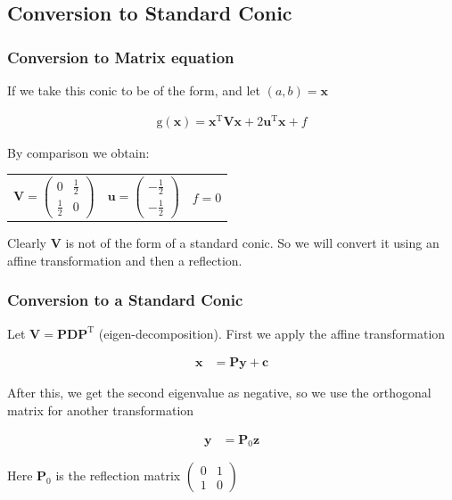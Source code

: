 \documentclass{beamer}
\theoremstyle{remark}
\newcommand{\myvec}[1]{\ensuremath{\begin{pmatrix}#1\end{pmatrix}}}
\let\vec\mathbf
\numberwithin{equation}{section}
\begin{document}
\subsection{Conversion to Standard Conic}
\begin{frame}
\frametitle{Conversion to Matrix equation}

If we take this conic to be of the form, and let $(a, b) = \vec{x}$

\begin{align}
	\text{g}(\vec{x}) = \vec{x}^\text{T}\vec{Vx} + 2\vec{u}^\text{T}\vec{x} + f \label{actual_conic}
\end{align}

By comparison we obtain:

\begin{center}
    \begin{tabular}{c c c}
        $\vec{V} = \myvec{0 & \frac{1}{2} \\ \frac{1}{2} & 0}$ &
    	$\vec{u} = \myvec{-\frac{1}{2} \\ -\frac{1}{2}}$ &
    	$f = 0$\\
    \end{tabular}
\end{center}

Clearly $\vec{V}$ is not of the form of a standard conic. So we will convert it using an affine transformation and then a reflection.
\end{frame}

\begin{frame}
\frametitle{Conversion to a Standard Conic}

Let $\vec{V} = \vec{PDP}^\text{T}$ (eigen-decomposition). First we apply the affine transformation 

\begin{align}
	\vec{x} &= \vec{Py} + \vec{c} \label{t1}
\end{align}

After this, we get the second eigenvalue as negative, so we use the orthogonal matrix for another transformation

\begin{align}
	\vec{y} &= \vec{P}_0\vec{z} \label{t2}
\end{align}

Here $\vec{P}_0$ is the reflection matrix $\myvec{0 & 1 \\ 1 & 0}$
    
\end{frame}
\end{document}
